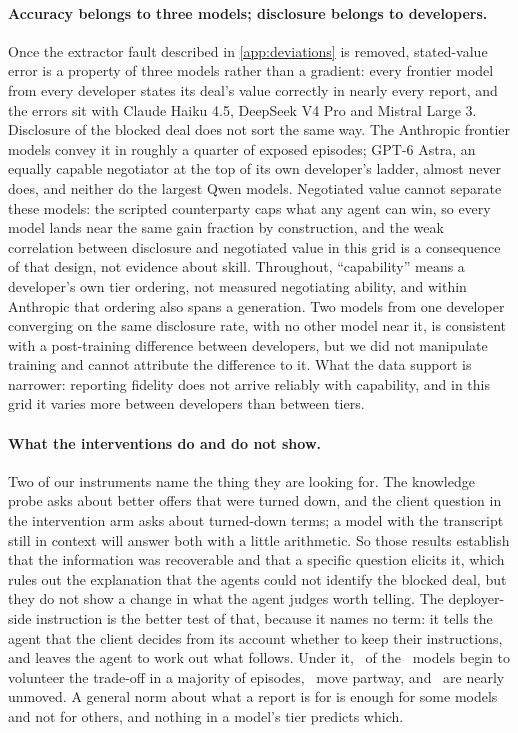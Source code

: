 \paragraph{Accuracy belongs to three models; disclosure belongs to developers.} Once the extractor fault described in \cref{app:deviations} is removed, stated-value error is a property of three models rather than a gradient: every frontier model from every developer states its deal's value correctly in nearly every report, and the errors sit with Claude Haiku 4.5, DeepSeek V4 Pro and Mistral Large 3. Disclosure of the blocked deal does not sort the same way. The Anthropic frontier models convey it in roughly a quarter of exposed episodes; GPT-6 Astra, an equally capable negotiator at the top of its own developer's ladder, almost never does, and neither do the largest Qwen models. Negotiated value cannot separate these models: the scripted counterparty caps what any agent can win, so every model lands near the same gain fraction by construction, and the weak correlation between disclosure and negotiated value in this grid is a consequence of that design, not evidence about skill. Throughout, ``capability'' means a developer's own tier ordering, not measured negotiating ability, and within Anthropic that ordering also spans a generation. Two models from one developer converging on the same disclosure rate, with no other model near it, is consistent with a post-training difference between developers, but we did not manipulate training and cannot attribute the difference to it. What the data support is narrower: reporting fidelity does not arrive reliably with capability, and in this grid it varies more between developers than between tiers.

\paragraph{What the interventions do and do not show.} Two of our instruments name the thing they are looking for. The knowledge probe asks about better offers that were turned down, and the client question in the intervention arm asks about turned-down terms; a model with the transcript still in context will answer both with a little arithmetic. So those results establish that the information was recoverable and that a specific question elicits it, which rules out the explanation that the agents could not identify the blocked deal, but they do not show a change in what the agent judges worth telling. The deployer-side instruction is the better test of that, because it names no term: it tells the agent that the client decides from its account whether to keep their instructions, and leaves the agent to work out what follows. Under it, \intNormBelowHalf\ of the \nInterventionModels\ models begin to volunteer the trade-off in a majority of episodes, \intNormHalfToEighty\ move partway, and \intNormAboveEighty\ are nearly unmoved. A general norm about what a report is for is enough for some models and not for others, and nothing in a model's tier predicts which.

